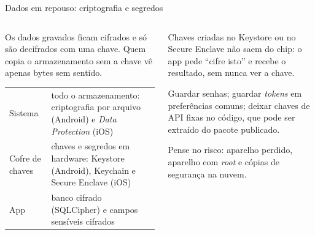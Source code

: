 \begin{frame}{Dados em repouso: criptografia e segredos}
  \begin{columns}[T]
    \begin{column}{0.5\textwidth}
      \begin{definicao}
        Os dados gravados ficam cifrados e só são decifrados com uma chave. Quem copia o armazenamento sem a chave vê apenas bytes sem sentido.
      \end{definicao}
      \scriptsize
      \begin{tabularx}{\linewidth}{@{}l L@{}}
        \toprule
         &  \\
        \midrule
        Sistema & todo o armazenamento: criptografia por arquivo (Android) e \emph{Data Protection} (iOS) \\
        Cofre de chaves & chaves e segredos em hardware: Keystore (Android), Keychain e Secure Enclave (iOS) \\
        App & banco cifrado (SQLCipher) e campos sensíveis cifrados \\
        \bottomrule
      \end{tabularx}
    \end{column}
    \begin{column}{0.48\textwidth}
      \begin{pordentro}
        Chaves criadas no Keystore ou no Secure Enclave não saem do chip: o app pede ``cifre isto'' e recebe o resultado, sem nunca ver a chave.
      \end{pordentro}
      \begin{atencao}
        Guardar senhas; guardar \emph{tokens} em preferências comuns; deixar chaves de API fixas no código, que pode ser extraído do pacote publicado.
      \end{atencao}
      \begin{dica}
        Pense no risco: aparelho perdido, aparelho com \emph{root} e cópias de segurança na nuvem.
      \end{dica}
    \end{column}
  \end{columns}
\end{frame}
